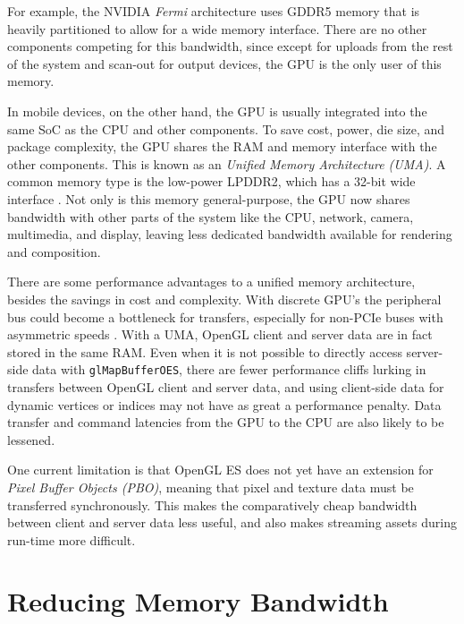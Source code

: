For example, the NVIDIA \textit{Fermi} architecture uses GDDR5 memory that is
heavily partitioned \cite{Walton10} to allow for a wide memory interface.
There are no other components competing for this bandwidth, since except for
uploads from the rest of the system and scan-out for output devices, the GPU is
the only user of this memory.

 

In mobile devices, on the other hand, the GPU is usually integrated into the
same SoC as the CPU and other components.  To save cost, power, die size, and
package complexity, the GPU shares the RAM and memory interface with the other
components.  This is known as an \textit{Unified Memory Architecture (UMA)}.  A
common memory type is the low-power LPDDR2, which has a 32-bit wide
interface \cite{Klug11b}.  Not only is this memory general-purpose, the GPU now
shares bandwidth with other parts of the system like the CPU, network, camera,
multimedia, and display, leaving less dedicated bandwidth available for
rendering and composition.


There are some performance advantages to a unified memory architecture, besides
the savings in cost and complexity.  With discrete GPU's the peripheral bus
could become a bottleneck for transfers, especially for non-PCIe buses with
asymmetric speeds \cite{Elhasson05}.  With a UMA, OpenGL client and server data
are in fact stored in the same RAM.  Even when it is not possible to directly
access server-side data with \texttt{glMapBufferOES}, there are fewer
performance cliffs lurking in transfers between OpenGL client and server data,
and using client-side data for dynamic vertices or indices may not have as
great a performance penalty.  Data transfer and command latencies from the GPU to the
CPU are also likely to be lessened.


One current limitation is that OpenGL ES does not yet have an extension for
\textit{Pixel Buffer Objects (PBO)}, meaning that pixel and texture data must
be transferred synchronously.  This makes the comparatively cheap bandwidth
between client and server data less useful, and also makes streaming assets
during run-time more difficult.

\section{Reducing Memory
Bandwidth}\label{Jon-McCaffrey:Reducing-Memory-Bandwidth}

